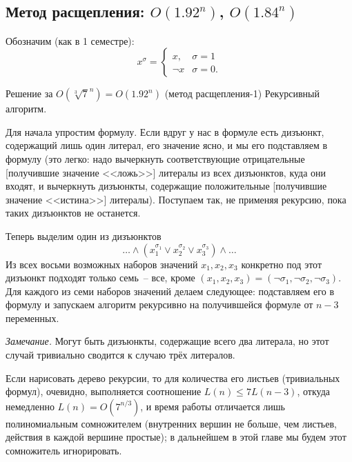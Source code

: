 \subsection{Метод расщепления: $O(1.92^n)$, $O(1.84^n)$}
Обозначим (как в 1 семестре): $$x^\sigma =
\begin{cases}
x, & \sigma = 1 \\
\neg x & \sigma = 0.
\end{cases}$$
\begin{algodescription}{Решение за $O\left(\sqrt[3]{7}^n\right) = O(1.92^n)$ (метод расщепления-1)}
	Рекурсивный алгоритм.

	Для начала упростим формулу. Если вдруг у нас в формуле есть дизъюнкт, содержащий лишь один литерал, его значение ясно, и мы его подставляем в формулу (это легко: надо вычеркнуть соответствующие отрицательные [получившие значение <<ложь>>] литералы из всех дизъюнктов, куда они входят, и вычеркнуть дизъюнкты, содержащие положительные [получившие значение <<истина>>] литералы). Поступаем так, не применяя рекурсию, пока таких дизъюнктов не останется.

	Теперь выделим один из дизъюнктов $$\ldots\land(x_1^{\sigma_1} \lor x_2^{\sigma_2} \lor x_3^{\sigma_3})\land\ldots$$ Из всех восьми возможных наборов значений $x_1, x_2, x_3$ конкретно под этот дизъюнкт подходят только семь~-- все, кроме $(x_1, x_2, x_3) = (\neg\sigma_1, \neg\sigma_2, \neg\sigma_3)$.
	Для каждого из семи наборов значений делаем следующее: подставляем его в формулу и запускаем алгоритм рекурсивно на получившейся формуле от $n-3$ переменных.

	\emph{Замечание.} Могут быть дизъюнкты, содержащие всего два литерала, но этот случай тривиально сводится к случаю трёх литералов.

	Если нарисовать дерево рекурсии, то для количества его листьев (тривиальных формул), очевидно, выполняется соотношение $L(n) \le 7L(n-3)$, откуда немедленно $L(n) = O(7^{n/3})$, и время работы отличается лишь полиномиальным сомножителем (внутренних вершин не больше, чем листьев, действия в каждой вершине простые); в дальнейшем в этой главе мы будем этот сомножитель игнорировать.
\end{algodescription}

